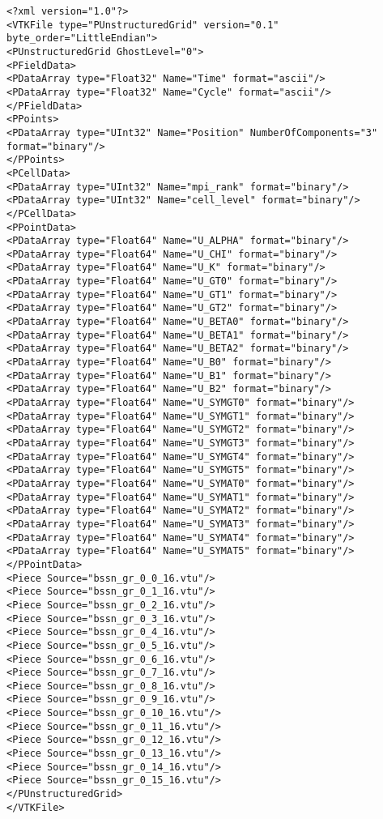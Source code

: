 \begin{lstlisting}[basicstyle=\small]
<?xml version="1.0"?>
<VTKFile type="PUnstructuredGrid" version="0.1" byte_order="LittleEndian">
<PUnstructuredGrid GhostLevel="0">
<PFieldData>
<PDataArray type="Float32" Name="Time" format="ascii"/>
<PDataArray type="Float32" Name="Cycle" format="ascii"/>
</PFieldData>
<PPoints>
<PDataArray type="UInt32" Name="Position" NumberOfComponents="3" format="binary"/>
</PPoints>
<PCellData>
<PDataArray type="UInt32" Name="mpi_rank" format="binary"/>
<PDataArray type="UInt32" Name="cell_level" format="binary"/>
</PCellData>
<PPointData>
<PDataArray type="Float64" Name="U_ALPHA" format="binary"/>
<PDataArray type="Float64" Name="U_CHI" format="binary"/>
<PDataArray type="Float64" Name="U_K" format="binary"/>
<PDataArray type="Float64" Name="U_GT0" format="binary"/>
<PDataArray type="Float64" Name="U_GT1" format="binary"/>
<PDataArray type="Float64" Name="U_GT2" format="binary"/>
<PDataArray type="Float64" Name="U_BETA0" format="binary"/>
<PDataArray type="Float64" Name="U_BETA1" format="binary"/>
<PDataArray type="Float64" Name="U_BETA2" format="binary"/>
<PDataArray type="Float64" Name="U_B0" format="binary"/>
<PDataArray type="Float64" Name="U_B1" format="binary"/>
<PDataArray type="Float64" Name="U_B2" format="binary"/>
<PDataArray type="Float64" Name="U_SYMGT0" format="binary"/>
<PDataArray type="Float64" Name="U_SYMGT1" format="binary"/>
<PDataArray type="Float64" Name="U_SYMGT2" format="binary"/>
<PDataArray type="Float64" Name="U_SYMGT3" format="binary"/>
<PDataArray type="Float64" Name="U_SYMGT4" format="binary"/>
<PDataArray type="Float64" Name="U_SYMGT5" format="binary"/>
<PDataArray type="Float64" Name="U_SYMAT0" format="binary"/>
<PDataArray type="Float64" Name="U_SYMAT1" format="binary"/>
<PDataArray type="Float64" Name="U_SYMAT2" format="binary"/>
<PDataArray type="Float64" Name="U_SYMAT3" format="binary"/>
<PDataArray type="Float64" Name="U_SYMAT4" format="binary"/>
<PDataArray type="Float64" Name="U_SYMAT5" format="binary"/>
</PPointData>
<Piece Source="bssn_gr_0_0_16.vtu"/>
<Piece Source="bssn_gr_0_1_16.vtu"/>
<Piece Source="bssn_gr_0_2_16.vtu"/>
<Piece Source="bssn_gr_0_3_16.vtu"/>
<Piece Source="bssn_gr_0_4_16.vtu"/>
<Piece Source="bssn_gr_0_5_16.vtu"/>
<Piece Source="bssn_gr_0_6_16.vtu"/>
<Piece Source="bssn_gr_0_7_16.vtu"/>
<Piece Source="bssn_gr_0_8_16.vtu"/>
<Piece Source="bssn_gr_0_9_16.vtu"/>
<Piece Source="bssn_gr_0_10_16.vtu"/>
<Piece Source="bssn_gr_0_11_16.vtu"/>
<Piece Source="bssn_gr_0_12_16.vtu"/>
<Piece Source="bssn_gr_0_13_16.vtu"/>
<Piece Source="bssn_gr_0_14_16.vtu"/>
<Piece Source="bssn_gr_0_15_16.vtu"/>
</PUnstructuredGrid>
</VTKFile> 
\end{lstlisting}